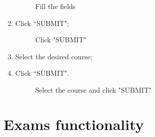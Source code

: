 \documentclass[ManualeUtente]{subfiles}
\begin{document}
\begin{enumerate}
\begin{figure}[H]
		\caption{Fill the fields}
		\label{fig:Fill the fields}
	\end{figure}
	\item Click \textquotedblleft SUBMIT";
	\begin{figure}[H]
		\centering
		\caption{Click "SUBMIT"}
		\label{fig:Click "SUBMIT"}
	\end{figure}
	\item Select the desired course;
	\item Click \textquotedblleft SUBMIT".
	\begin{figure}[H]
		\centering
		\caption{Select the course and click "SUBMIT"}
		\label{fig:Select the course and click "SUBMIT"}
	\end{figure}
\end{enumerate}

\newpage
\section{Exams functionality}
\end{document}
